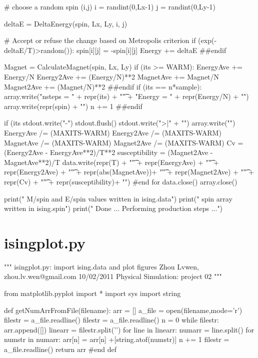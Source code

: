 \documentclass[11pt,a4paper,boxed]{caspset}
\begin{document}
\begin{subappendices}
\begin{python}
        # choose a random spin (i,j)
        i = randint(0,Lx-1)
        j = randint(0,Ly-1)

        deltaE = DeltaEnergy(spin, Lx, Ly, i, j)

        # Accept or refuse the change based on Metropolis criterion
        if (exp(-deltaE/T)>random()):
           spin[i][j] = -spin[i][j]
           Energy +=  deltaE
        ##endif

        Magnet = CalculateMagnet(spin, Lx, Ly)
        if (its >= WARM):
           EnergyAve += Energy/N
           Energy2Ave += (Energy/N)**2
           MagnetAve += Magnet/N
           Magnet2Ave += (Magnet/N)**2
        ##endif
        if (its == n*sample):
           array.write("nsteps = " + repr(its) + "\t" +
                       "Energy = " + repr(Energy/N) + "\n")
           array.write(repr(spin) + "\n")
           n += 1
        ##endif

        if (its%
            stdout.write("-")
            stdout.flush()
    stdout.write(">|" + "\n")
    array.write("\n")
    EnergyAve  /= (MAXITS-WARM)
    Energy2Ave /= (MAXITS-WARM)
    MagnetAve  /= (MAXITS-WARM)
    Magnet2Ave /= (MAXITS-WARM)
    Cv = (Energy2Ave - EnergyAve**2)/T**2
    susceptibility = (Magnet2Ave - MagnetAve**2)/T
    data.write(repr(T)             + "\t" +
               repr(EnergyAve)     + "\t" +
               repr(Energy2Ave)    + "\t" +
               repr(abs(MagnetAve))+ "\t" +
               repr(Magnet2Ave)    + "\t" +
               repr(Cv)            + "\t" +
               repr(susceptibility)+ "\n")
#end for
data.close()
array.close()

print(" M/spin and E/spin values written in ising.data")
print(" spin array written in ising.spin")
print(" Done ... Performing production steps ...")
\end{python}

\section{isingplot.py}
\begin{python}
"""
isingplot.py: import ising.data and plot figures
Zhou Lvwen, zhou.lv.wen@gmail.com
10/02/2011
Physical Simulation: project 02
"""

from matplotlib.pyplot import *
import sys
import string

def getNumArrFromFile(filename):
    arr = []
    a_file = open(filename,mode='r')
    filestr = a_file.readline()
    filestr = a_file.readline()
    n = 0
    while filestr:
       arr.append([])
       linearr = filestr.split('\n')
       for line in linearr:
           numarr = line.split()
           for numstr in numarr:
               arr[n] = arr[n] +[string.atof(numstr)]
       n += 1
       filestr = a_file.readline()
    return arr
#end def


\end{python}
\end{subappendices}
\end{document}
